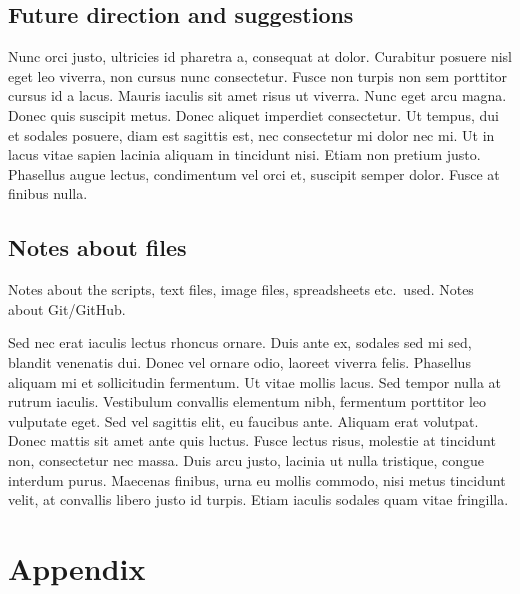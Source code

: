 \documentclass[parskip=full]{scrreprt}
\begin{document}
\section{Future direction and suggestions}
\label{sec:future}

Nunc orci justo, ultricies id pharetra a, consequat at dolor. Curabitur posuere nisl eget leo viverra, non cursus nunc consectetur. Fusce non turpis non sem porttitor cursus id a lacus. Mauris iaculis sit amet risus ut viverra. Nunc eget arcu magna. Donec quis suscipit metus. Donec aliquet imperdiet consectetur. Ut tempus, dui et sodales posuere, diam est sagittis est, nec consectetur mi dolor nec mi. Ut in lacus vitae sapien lacinia aliquam in tincidunt nisi. Etiam non pretium justo. Phasellus augue lectus, condimentum vel orci et, suscipit semper dolor. Fusce at finibus nulla.

\section{Notes about files}
\label{sec:files}

Notes about the scripts, text files, image files, spreadsheets etc.\ used. Notes about Git/GitHub.

Sed nec erat iaculis lectus rhoncus ornare. Duis ante ex, sodales sed mi sed, blandit venenatis dui. Donec vel ornare odio, laoreet viverra felis. Phasellus aliquam mi et sollicitudin fermentum. Ut vitae mollis lacus. Sed tempor nulla at rutrum iaculis. Vestibulum convallis elementum nibh, fermentum porttitor leo vulputate eget. Sed vel sagittis elit, eu faucibus ante. Aliquam erat volutpat. Donec mattis sit amet ante quis luctus. Fusce lectus risus, molestie at tincidunt non, consectetur nec massa. Duis arcu justo, lacinia ut nulla tristique, congue interdum purus. Maecenas finibus, urna eu mollis commodo, nisi metus tincidunt velit, at convallis libero justo id turpis. Etiam iaculis sodales quam vitae fringilla. 

\chapter*{Appendix}
\label{ch:appendix}



\nocite{*}
\printbibliography
\end{document}
